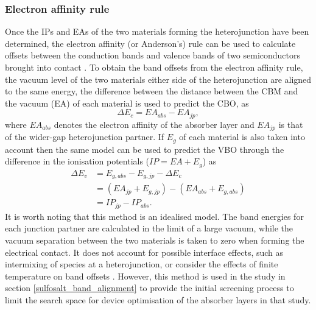 \documentclass[11pt, twoside]{report}
\begin{document}
\subsubsection{Electron affinity rule}
Once the IPs and EAs of the two materials forming the heterojunction have been determined, the electron affinity (or Anderson's) rule can be used to calculate offsets between the conduction bands and valence bands of two semiconductors brought into contact \cite{Anderson_rule, keith_contacts}.
To obtain the band offsets from the electron affinity rule, the vacuum level of the two materials either side of the heterojunction are aligned to the same energy, the difference between the distance between the CBM and the vacuum (EA) of each material is used to predict the CBO, as 
\begin{equation}\label{CBO_calc}
\Delta E_c = EA_{abs} - EA_{jp},
\end{equation}
where $EA_{abs}$ denotes the electron affinity of the absorber layer and $EA_{jp}$ is that of the wider-gap heterojunction partner. If $E_g$ of each material is also taken into account then the same model can be used to predict the VBO through the difference in the ionisation potentials ($IP = EA + E_g$) as 
\begin{equation}\label{VBO_calc}
\begin{aligned}
\Delta E_v & = E_{g,abs} - E_{g,jp} - \Delta E_c \\
& = (EA_{jp}+ E_{g, jp}) - (EA_{abs} + E_{g,abs}) \\
& = IP_{jp} - IP_{abs}.
\end{aligned}
\end{equation}
It is worth noting that this method is an idealised model. The band energies for each junction partner are calculated in the limit of a large vacuum, while the vacuum separation between the two materials is taken to zero when forming the electrical contact. It does not account for possible interface effects, such as intermixing of species at a heterojunction, or consider the effects of finite temperature on band offsets \cite{Bartomeu_T_effects}. However, this method is used in the study in section \ref{sulfosalt_band_alignment} to provide the initial screening process to limit the search space for device optimisation of the absorber layers in that study.
\end{document}
